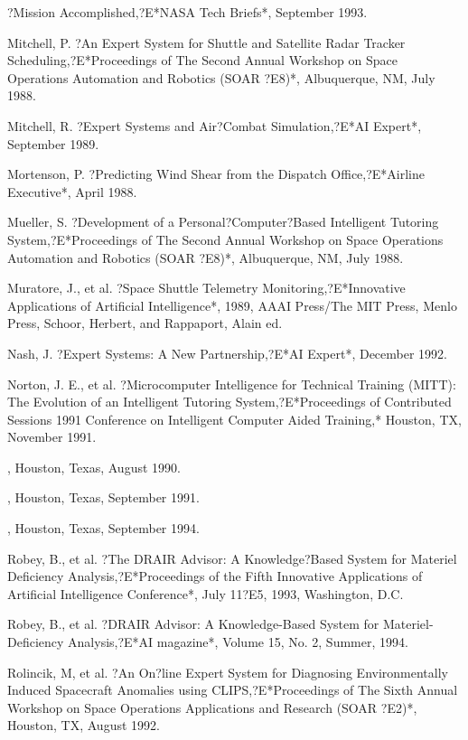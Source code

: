 \documentclass[letterpaper,10pt,english]{sphinxmanual}
\begin{document}
?Mission Accomplished,?E*NASA Tech Briefs*, September 1993.

Mitchell, P. ?An Expert System for Shuttle and Satellite Radar Tracker
Scheduling,?E*Proceedings of The Second Annual Workshop on Space
Operations Automation and Robotics (SOAR ?E8)*, Albuquerque, NM, July
1988.

Mitchell, R. ?Expert Systems and Air?Combat Simulation,?E*AI Expert*,
September 1989.

Mortenson, P. ?Predicting Wind Shear from the Dispatch Office,?E*Airline
Executive*, April 1988.

Mueller, S. ?Development of a Personal?Computer?Based Intelligent
Tutoring System,?E*Proceedings of The Second Annual Workshop on Space
Operations Automation and Robotics (SOAR ?E8)*, Albuquerque, NM, July
1988.

Muratore, J., et al. ?Space Shuttle Telemetry Monitoring,?E*Innovative
Applications of Artificial Intelligence*, 1989, AAAI Press/The MIT
Press, Menlo Press, Schoor, Herbert, and Rappaport, Alain ed.

Nash, J. ?Expert Systems: A New Partnership,?E*AI Expert*, December
1992.

Norton, J. E., et al. ?Microcomputer Intelligence for Technical Training
(MITT): The Evolution of an Intelligent Tutoring System,?E*Proceedings
of Contributed Sessions 1991 Conference on Intelligent Computer Aided
Training,* Houston, TX, November 1991.

, Houston, Texas, August
1990.

, Houston, Texas, September
1991.

, Houston, Texas, September
1994.

Robey, B., et al. ?The DRAIR Advisor: A Knowledge?Based System for
Materiel Deficiency Analysis,?E*Proceedings of the Fifth Innovative
Applications of Artificial Intelligence Conference*, July 11?E5, 1993,
Washington, D.C.

Robey, B., et al. ?DRAIR Advisor: A Knowledge-Based System for
Materiel-Deficiency Analysis,?E*AI magazine*, Volume 15, No. 2, Summer,
1994.

Rolincik, M, et al. ?An On?line Expert System for Diagnosing
Environmentally Induced Spacecraft Anomalies using CLIPS,?E*Proceedings
of The Sixth Annual Workshop on Space Operations Applications and
Research (SOAR ?E2)*, Houston, TX, August 1992.
\end{document}
